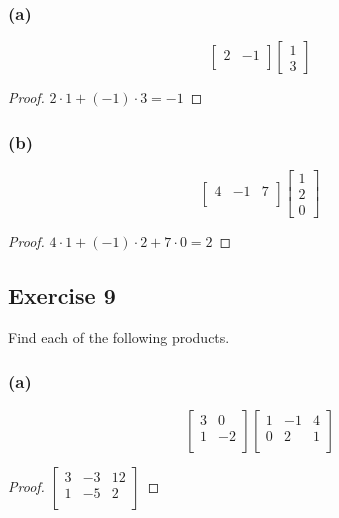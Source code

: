 \documentclass[14pt]{extarticle}
\begin{document}
\subsubsection{(a)}
\[
\left[ 
\begin{array}{rr}
2 & -1 \\
\end{array}
\right]
\left[ 
\begin{array}{c}
1 \\
3
\end{array}
\right]
\]
\begin{proof}
\(2 \cdot 1 + (-1) \cdot 3 = -1\)
\end{proof}

\subsubsection{(b)}
\[
\left[ 
\begin{array}{rrr}
4 & -1 & 7 \\
\end{array}
\right]
\left[ 
\begin{array}{c}
1 \\
2 \\
0
\end{array}
\right]
\]
\begin{proof}
\(4 \cdot 1 + (-1) \cdot 2 + 7 \cdot 0 = 2\)
\end{proof}

\subsection{Exercise 9}
Find each of the following products.

\subsubsection{(a)}
\[
\left[ 
\begin{array}{rr}
3 & 0 \\
1 & -2 \\
\end{array}
\right]
\left[ 
\begin{array}{rrr}
1 & -1 & 4 \\
0 & 2 & 1 \\
\end{array}
\right]
\]
\begin{proof}
\(\left[ 
\begin{array}{rrr}
3 & -3 & 12 \\
1 & -5 & 2 \\
\end{array}
\right]\)
\end{proof}
\end{document}
